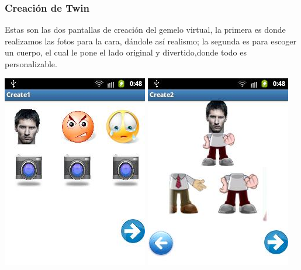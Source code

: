 \documentclass[10pt]{article}
\begin{document}
{\begin{flushleft}
\subsubsection{Creaci\'on de Twin}
Estas son las dos pantallas de creaci\'on del gemelo virtual, la primera es donde realizamos las fotos para la cara, d\'andole as\'i realismo; la segunda es para escoger un cuerpo, el cual le pone el lado original y divertido,donde todo es personalizable. \\
\begin{center}
\vspace{0.1in}
\includegraphics[scale=0.7]{create1.jpg}
\hspace{0.4in}\includegraphics[scale=0.7]{create2.jpg}
\end{center}



\newpage

\end{flushleft}}
\end{document}
